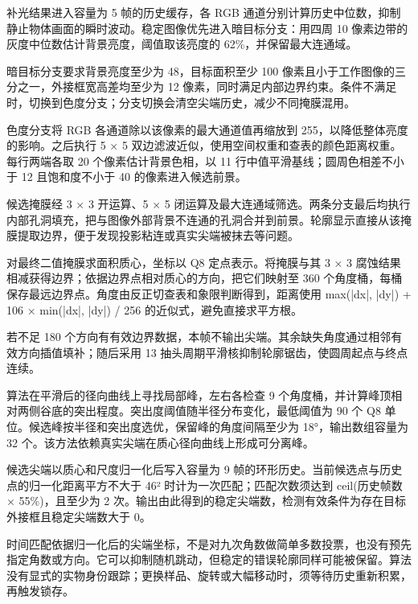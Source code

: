 \documentclass[UTF8,fontset=windows,a4paper,11pt]{ctexart}
\begin{document}
补光结果进入容量为 5 帧的历史缓存，各 RGB 通道分别计算历史中位数，抑制静止物体画面的瞬时波动。稳定图像优先进入暗目标分支：用四周 10 像素边带的灰度中位数估计背景亮度，阈值取该亮度的 62\%，并保留最大连通域。\par

暗目标分支要求背景亮度至少为 48，目标面积至少 100 像素且小于工作图像的三分之一，外接框宽高差均至少为 12 像素，同时满足内部边界约束。条件不满足时，切换到色度分支；分支切换会清空尖端历史，减少不同掩膜混用。\par

色度分支将 RGB 各通道除以该像素的最大通道值再缩放到 255，以降低整体亮度的影响。之后执行 5 × 5 双边滤波近似，使用空间权重和查表的颜色距离权重。每行两端各取 20 个像素估计背景色相，以 11 行中值平滑基线；圆周色相差不小于 12 且饱和度不小于 40 的像素进入候选前景。\par

候选掩膜经 3 × 3 开运算、5 × 5 闭运算及最大连通域筛选。两条分支最后均执行内部孔洞填充，把与图像外部背景不连通的孔洞合并到前景。轮廓显示直接从该掩膜提取边界，便于发现投影粘连或真实尖端被抹去等问题。\par

对最终二值掩膜求面积质心，坐标以 Q8 定点表示。将掩膜与其 3 × 3 腐蚀结果相减获得边界；依据边界点相对质心的方向，把它们映射至 360 个角度桶，每桶保存最远边界点。角度由反正切查表和象限判断得到，距离使用 max(|dx|, |dy|) + 106 × min(|dx|, |dy|) / 256 的近似式，避免直接求平方根。\par

若不足 180 个方向有有效边界数据，本帧不输出尖端。其余缺失角度通过相邻有效方向插值填补；随后采用 13 抽头周期平滑核抑制轮廓锯齿，使圆周起点与终点连续。\par

算法在平滑后的径向曲线上寻找局部峰，左右各检查 9 个角度桶，并计算峰顶相对两侧谷底的突出程度。突出度阈值随半径分布变化，最低阈值为 90 个 Q8 单位。候选峰按半径和突出度选优，保留峰的角度间隔至少为 18°，输出数组容量为 32 个。该方法依赖真实尖端在质心径向曲线上形成可分离峰。\par

候选尖端以质心和尺度归一化后写入容量为 9 帧的环形历史。当前候选点与历史点的归一化距离平方不大于 46² 时计为一次匹配；匹配次数须达到 ceil(历史帧数 × 55\%)，且至少为 2 次。输出由此得到的稳定尖端数，检测有效条件为存在目标外接框且稳定尖端数大于 0。\par

时间匹配依据归一化后的尖端坐标，不是对九次角数做简单多数投票，也没有预先指定角数或方向。它可以抑制随机跳动，但稳定的错误轮廓同样可能被保留。算法没有显式的实物身份跟踪；更换样品、旋转或大幅移动时，须等待历史重新积累，再触发锁存。\par
\end{document}
